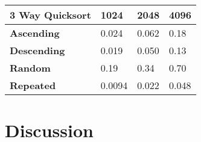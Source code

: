 \documentclass{article}
\begin{document}
\begin{table}[H]
\centering
\begin{tabularx}{\linewidth}{| X | X | X | X |}
\hline
\textbf{3 Way Quicksort} & \textbf{1024} & \textbf{2048} & \textbf{4096} \\
\hline
\textbf{Ascending} & 0.024 & 0.062 & 0.18 \\
\hline
\textbf{Descending} & 0.019 & 0.050 & 0.13 \\
\hline
\textbf{Random}  & 0.19 & 0.34 & 0.70 \\
\hline
\textbf{Repeated} & 0.0094 & 0.022 & 0.048 \\
\hline
\end{tabularx}
\end{table}

\section{Discussion}
\end{document}
